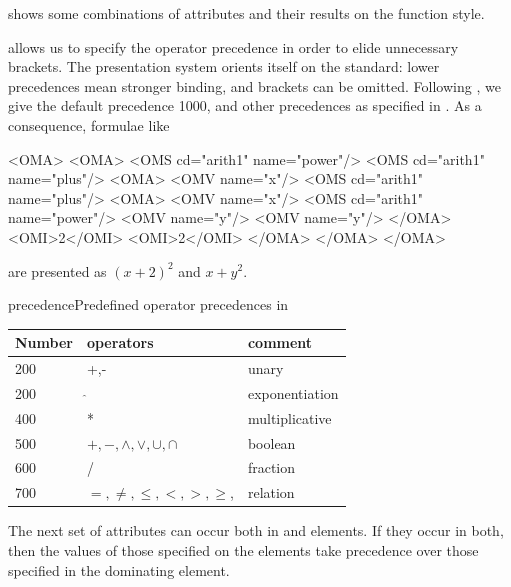 \begin{description}
  {} shows some combinations of attributes and their
  results on the function style.
\item[{\attribute{precedence}{presentation}}] allows us to specify the operator precedence in
  order to elide unnecessary brackets. The {\omdoc} presentation system orients
  itself on the {} standard: lower precedences mean stronger
  binding, and brackets can be omitted. Following {}, we give the
  default precedence 1000, and other precedences as specified in
  {}. As a consequence, formulae like 
  \begin{center}
    \begin{boxedverbatim}
 <OMA>                                 <OMA>
  <OMS cd="arith1" name="power"/>       <OMS cd="arith1" name="plus"/>   
  <OMA>                                  <OMV name="x"/>
   <OMS cd="arith1" name="plus"/>        <OMA>
   <OMV name="x"/>                        <OMS cd="arith1" name="power"/>
   <OMV name="y"/>                        <OMV name="y"/>
  </OMA>                                  <OMI>2</OMI>
  <OMI>2</OMI>                           </OMA>
 </OMA>                                 </OMA>
\end{boxedverbatim}
\end{center}
are presented as $(x+2)^2$ and $x+y^2$.
\begin{myfig}{precedence}{Predefined operator precedences in {\omdoc}}
  \begin{tabular}{|l|l|l|}\hline
    Number & operators & comment\\\hline\hline
    200    & +,-       & unary \\\hline
    200    & $\hat{}$    & exponentiation \\\hline
    400    & *       & multiplicative \\\hline
    500    & $+,-,\land,\lor,\cup,\cap$ & boolean\\\hline
    600    & /       & fraction \\\hline
    700    & $=, \ne, \leq, <, >, \geq$, & relation\\\hline
  \end{tabular}
\end{myfig}
\end{description}
The next set of attributes can occur both in {} and
{} elements. If they occur in both, then the values of those
specified on the {} elements take precedence over those specified in
the dominating {} element. 
